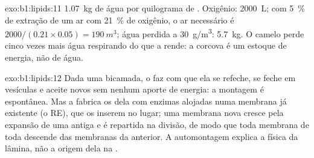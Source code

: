 \begin{solution}{exo:b1:lipids:11}
\qty{1.07}{kg} de água por quilograma de . Oxigênio:
\qty{2000}{L}; com \qty{5}{\%} de extração de um ar com \qty{21}{\%} de
oxigênio, o ar necessário é $2000/(0.21\times 0.05) = \qty{190}{m^3}$;
água perdida a \qty{30}{g/m^3}: \qty{5.7}{kg}. O camelo perde cinco
vezes mais água respirando do que a  rende: a corcova é um
estoque de energia, não de água.
\end{solution}

\begin{solution}{exo:b1:lipids:12}
Dada uma bicamada, o  faz com que ela se refeche, se
feche em vesículas e aceite  novos sem nenhum aporte de energia:
a montagem é espontânea. Mas a  fabrica os  dela com
enzimas alojadas numa membrana já existente (o RE), que os inserem no
lugar; uma membrana nova cresce pela expansão de uma antiga e é
repartida na divisão, de modo que toda membrana de toda  descende
das membranas da  anterior. A automontagem explica a física da
lâmina, não a origem dela na .
\end{solution}

